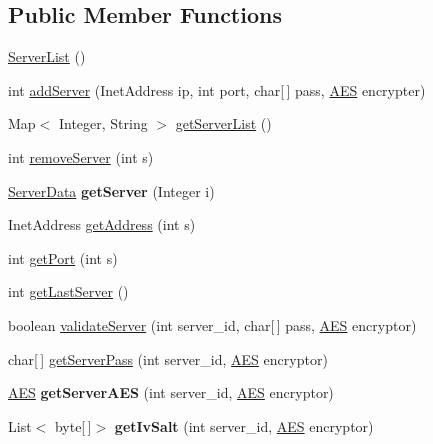 \subsection*{\-Public \-Member \-Functions}
\begin{DoxyCompactItemize}
\item 
\hyperlink{classstorage_1_1_server_list_a9c4149e053b28b2430ae1fdcdc035d2b}{\-Server\-List} ()
\item 
int \hyperlink{classstorage_1_1_server_list_a1e137bec7ebcddf53a37e344d239563a}{add\-Server} (\-Inet\-Address ip, int port, char\mbox{[}$\,$\mbox{]} pass, \hyperlink{classsecurity_1_1_a_e_s}{\-A\-E\-S} encrypter)
\item 
\-Map$<$ \-Integer, \-String $>$ \hyperlink{classstorage_1_1_server_list_a179500fe2ef0804625699a82c7716ab0}{get\-Server\-List} ()
\item 
int \hyperlink{classstorage_1_1_server_list_abf9871c317e9f2f467d0acef06740007}{remove\-Server} (int s)
\item 
\hypertarget{classstorage_1_1_server_list_ae2175087fe0a86ad0010832de6c57e8d}{
\hyperlink{classstorage_1_1_server_list_1_1_server_data}{\-Server\-Data} {\bfseries get\-Server} (\-Integer i)}
\label{classstorage_1_1_server_list_ae2175087fe0a86ad0010832de6c57e8d}

\item 
\-Inet\-Address \hyperlink{classstorage_1_1_server_list_a6771878ea6a19ff71c936f1233602e3c}{get\-Address} (int s)
\item 
int \hyperlink{classstorage_1_1_server_list_a3d52877c0a72151efd20d7bc8b2be9fe}{get\-Port} (int s)
\item 
int \hyperlink{classstorage_1_1_server_list_a94e4fb4dea6474c9a242b730f3123240}{get\-Last\-Server} ()
\item 
boolean \hyperlink{classstorage_1_1_server_list_a8769af3910b709dd60efdaa43c1459cc}{validate\-Server} (int server\-\_\-id, char\mbox{[}$\,$\mbox{]} pass, \hyperlink{classsecurity_1_1_a_e_s}{\-A\-E\-S} encryptor)
\item 
char\mbox{[}$\,$\mbox{]} \hyperlink{classstorage_1_1_server_list_aad1d9eb243eeec18b8d564aab811f31d}{get\-Server\-Pass} (int server\-\_\-id, \hyperlink{classsecurity_1_1_a_e_s}{\-A\-E\-S} encryptor)
\item 
\hypertarget{classstorage_1_1_server_list_aef92106f14d8bba16812d82ed536f614}{
\hyperlink{classsecurity_1_1_a_e_s}{\-A\-E\-S} {\bfseries get\-Server\-A\-E\-S} (int server\-\_\-id, \hyperlink{classsecurity_1_1_a_e_s}{\-A\-E\-S} encryptor)}
\label{classstorage_1_1_server_list_aef92106f14d8bba16812d82ed536f614}

\item 
\hypertarget{classstorage_1_1_server_list_a1c56cd0abbf75a96dcb6265695156093}{
\-List$<$ byte\mbox{[}$\,$\mbox{]}$>$ {\bfseries get\-Iv\-Salt} (int server\-\_\-id, \hyperlink{classsecurity_1_1_a_e_s}{\-A\-E\-S} encryptor)}
\label{classstorage_1_1_server_list_a1c56cd0abbf75a96dcb6265695156093}

\end{DoxyCompactItemize}


